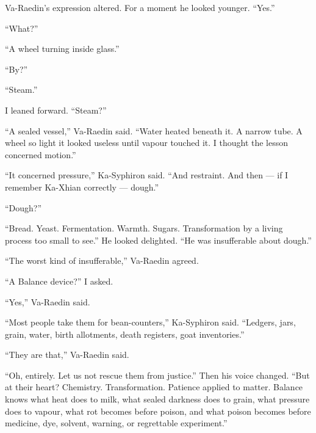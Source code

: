 Va-Raedin's expression altered. For a moment he looked younger. ``Yes.''\par

``What?''\par

``A wheel turning inside glass.''\par

``By?''\par

``Steam.''\par

I leaned forward. ``Steam?''\par

``A sealed vessel,'' Va-Raedin said. ``Water heated beneath it. A narrow tube. A wheel so light it looked useless until vapour touched it. I thought the lesson concerned motion.''\par

``It concerned pressure,'' Ka-Syphiron said. ``And restraint. And then --- if I remember Ka-Xhian correctly --- dough.''\par

``Dough?''\par

``Bread. Yeast. Fermentation. Warmth. Sugars. Transformation by a living process too small to see.''
He looked delighted. ``He was insufferable about dough.''\par

``The worst kind of insufferable,'' Va-Raedin agreed.\par

``A Balance device?'' I asked.\par

``Yes,'' Va-Raedin said.\par

``Most people take them for bean-counters,'' Ka-Syphiron said. ``Ledgers, jars, grain, water, birth allotments, death registers, goat inventories.''\par

``They are that,'' Va-Raedin said.\par

``Oh, entirely. Let us not rescue them from justice.'' Then his voice changed.
``But at their heart? Chemistry. Transformation. Patience applied to matter.
Balance knows what heat does to milk, what sealed darkness does to grain, what pressure does to vapour, what rot becomes before poison, and what poison becomes before medicine, dye, solvent, warning, or regrettable experiment.''\par

